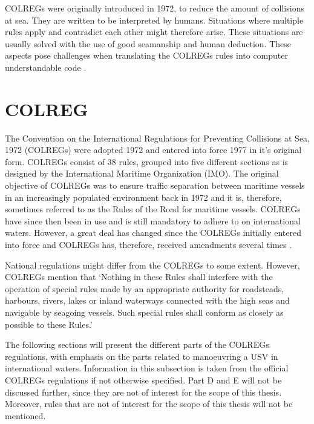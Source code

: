 COLREGs were originally introduced in 1972, to reduce the amount of collisions at sea. They are written to be interpreted by humans. Situations where multiple rules apply and contradict each other might therefore arise. These situations are usually solved with the use of good seamanship and human deduction. These aspects pose challenges when translating the COLREGs rules into computer understandable code \cite{benjamin2006method}.


\chapter{COLREG}
\label{sec_colreg}
The Convention on the International Regulations for Preventing Collisions at Sea, 1972 (COLREGs) were adopted 1972 and entered into force 1977 in it's original form. COLREGs consist of 38 rules, grouped into five different sections as is designed by the International Maritime Organization (IMO).
The original objective of COLREGs was to ensure traffic separation between maritime vessels in an increasingly populated environment back in 1972 and it is, therefore, sometimes referred to as the Rules of the Road for maritime vessels. COLREGs have since then been in use and is still mandatory to adhere to on international waters. However, a great deal has changed since the COLREGs initially entered into force and COLREGs has, therefore,
received amendments several times \cite{colreg_about_imo}.

National regulations might differ from the COLREGs to some extent. However, COLREGs mention that ‘Nothing in these Rules shall interfere with the operation of special rules made by an appropriate authority for roadsteads, harbours, rivers, lakes or inland waterways connected with the high seas and navigable by seagoing vessels.
Such special rules shall conform as closely as possible to these Rules.’ \cite{colreg}

The following sections will present the different parts of the COLREGs regulations, with emphasis on the parts related to manoeuvring a USV in international waters. Information in this subsection is taken from the official COLREGs regulations  \cite{colreg} if not otherwise specified. Part D and E will not be discussed further, since they are not of interest for the scope of this thesis. Moreover, rules that are not of interest for the scope of this thesis will not be mentioned.
